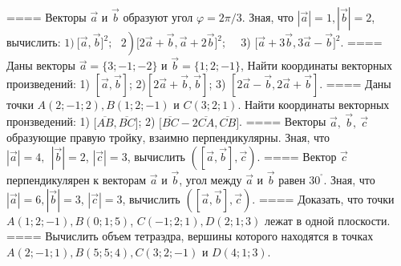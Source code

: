 ====
Векторы \(\overrightarrow{a}\) и \(\overrightarrow{b}\) образуют угол \(\varphi = 2\pi/3\). Зная, что \(|\overrightarrow{a}| = 1,|\overrightarrow{b}| = 2\), вычислить: \(1)\left. \ \lbrack\overrightarrow{a},\overrightarrow{b}\rbrack^{2};\ \ \ 2 \right)\lbrack 2\overrightarrow{a} + \overrightarrow{b},\overrightarrow{a} + 2\overrightarrow{b}\rbrack^{2};\ \ \ \ \) 3) \(\lbrack\overrightarrow{a} + 3\overrightarrow{b},3\overrightarrow{a} - \overrightarrow{b}\rbrack^{2}\).
====
Даны векторы \(\overrightarrow{a} = \{ 3; - 1; - 2\}\) и \(\overrightarrow{b} = \{ 1;2; - 1\}\), Найти координаты векторных произведений: 1) \(\left\lbrack \overrightarrow{a},\overrightarrow{b} \right\rbrack\); 2)\(\left\lbrack 2\overrightarrow{a} + \overrightarrow{b},\overrightarrow{b} \right\rbrack\); 3) \(\left\lbrack 2\overrightarrow{a} - \overrightarrow{b},2\overrightarrow{a} + \overrightarrow{b} \right\rbrack\).
====
Даны точки \(A(2; - 1;2),B(1;2; - 1)\) и \(C(3;2;1)\). Найти координаты векторных пронзведений: 1) \(\lbrack\overline{AB},\overline{BC}\rbrack\); 2) \(\lbrack\overline{BC} - 2\overline{CA},\overline{CB}\rbrack\).
====
Векторы \(\overrightarrow{a},\ \overrightarrow{b},\ \overrightarrow{c}\) образующие правую тройку, взаимно перпендикулярны. Зная, что \(|\overrightarrow{a}| = 4,\ \ |\overrightarrow{b}| = 2\), \(|\overrightarrow{c}| = 3\), вычислить \(\left( \left\lbrack \overrightarrow{a},\overrightarrow{b} \right\rbrack,\overrightarrow{c} \right)\).
====
Вектор \(\overrightarrow{c}\) перпендикулярен к векторам \(\overrightarrow{a}\) и \(\overrightarrow{b}\), угол между \(\overrightarrow{a}\) и \(\overrightarrow{b}\) равен \(30^{{^\circ}}\). Зная, что \(|\overrightarrow{a}| = 6,|\overrightarrow{b}| = 3\), \(|\overrightarrow{c}| = 3\), вычислить \(\left( \left\lbrack \overrightarrow{a},\overrightarrow{b} \right\rbrack,\overrightarrow{c} \right)\).
====
Доказать, что точки \(A(1;2; - 1),B(0;1;5)\), \(C( - 1;2;1),D(2;1;3)\) лежат в одной плоскости.
====
Вычислить объем тетраэдра, вершины которого находятся в точках \(A(2; - 1;1),B(5;5;4),C(3;2; - 1)\) и \(D(4;1;3)\).